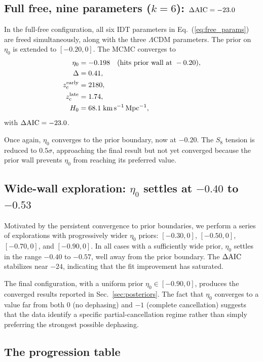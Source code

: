 \documentclass[aps,prd,twocolumn,superscriptaddress,nofootinbib]{revtex4-2}
\newcommand{\zc}{z_{\rm c}}
\newcommand{\Hubble}{H_0}
\newcommand{\dAIC}{\Delta{\rm AIC}}
\newcommand{\etaz}{\eta_0}
\begin{document}
\subsection{Full free, nine parameters ($k = 6$): $\dAIC = -23.0$}
\label{sec:full_free}

In the full-free configuration, all six IDT parameters in
Eq.~(\ref{eq:free_params}) are freed simultaneously, along with the
three $\Lambda$CDM parameters. The prior on $\etaz$ is extended to
$[-0.20, 0]$. The MCMC converges to
\begin{align}
\etaz &= -0.198 \quad (\text{hits prior wall at } -0.20), \nonumber\\
\Delta &= 0.41, \nonumber\\
\zc^{\rm early} &= 2180, \nonumber\\
\zc^{\rm late} &= 1.74, \nonumber\\
\Hubble &= 68.1\;\mathrm{km\,s^{-1}\,Mpc^{-1}},
\end{align}
with $\dAIC = -23.0$.

Once again, $\etaz$ converges to the prior boundary, now at $-0.20$.
The $S_8$ tension is reduced to $0.5\sigma$, approaching the final
result but not yet converged because the prior wall prevents $\etaz$
from reaching its preferred value.

\subsection{Wide-wall exploration: $\etaz$ settles at $-0.40$ to $-0.53$}
\label{sec:wide_wall}

Motivated by the persistent convergence to prior boundaries, we
perform a series of explorations with progressively wider $\etaz$
priors: $[-0.30, 0]$, $[-0.50, 0]$, $[-0.70, 0]$, and
$[-0.90, 0]$. In all cases with a sufficiently wide prior, $\etaz$
settles in the range $-0.40$ to $-0.57$, well away from the prior
boundary. The $\dAIC$ stabilizes near $-24$, indicating that the fit
improvement has saturated.

The final configuration, with a uniform prior $\etaz \in [-0.90, 0]$,
produces the converged results reported in
Sec.~\ref{sec:posteriors}. The fact that $\etaz$ converges to a value
far from both $0$ (no dephasing) and $-1$ (complete cancellation)
suggests that the data identify a specific partial-cancellation regime
rather than simply preferring the strongest possible dephasing.

\subsection{The progression table}
\label{sec:progression_table}
\end{document}
